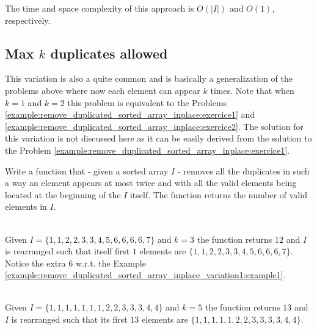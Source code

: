 The time and space complexity of this approach is $O(|I|)$ and $O(1)$, respectively.

\subsection{Max $k$ duplicates allowed}
This variation is also a quite common and is basically a generalization of the problems above where now each element can appear $k$ times.
Note that when $k= 1$ and $k=2$ this problem is equivalent to the Problems \ref{example:remove_duplicated_sorted_array_inplace:exercice1} and \ref{example:remove_duplicated_sorted_array_inplace:exercice2}.
The solution for this variation is not discussed here as it can be easily derived from the solution to the Problem \ref{example:remove_duplicated_sorted_array_inplace:exercice1}.

\begin{exercise}
Write a function that  - given a sorted array $I$  - removes all the 
duplicates in such a way an element appears at most twice and with all the valid elements being located at the beginning of the $I$ itself.
The function returns the number of valid elements in $I$.
	
	\label{example:remove_duplicated_sorted_array_inplace_variation:exercice3}
	
		\begin{example}
			\label{example:remove_duplicated_sorted_array_inplace_variation2:example1}
			\hfill \\
			Given $I=\{1,1,2,2,3,3,4,5,6,6,6,6,7\}$ and $k=3$ the function returns $12$ and $I$ is rearranged such
			that itself first $1$ elements are $\{1,1,2,2,3,3,4,5,6,6,6,7\}$. Notice the extra $6$ w.r.t. the Example \ref{example:remove_duplicated_sorted_array_inplace_variation1:example1}.
		\end{example}
	
		\begin{example}
			\label{example:remove_duplicated_sorted_array_inplace_variation2:example2}
			\hfill \\
			Given $I=\{1,1,1,1,1,1,1,2,2,3,3,3,4,4\}$ and $k=5$ the function returns $13$ and $I$ is rearranged such that its first $13$
			elements are $\{1,1,1,1,1,2,2,3,3,3,3,4,4\}$.	
		\end{example}
	\end{exercise}